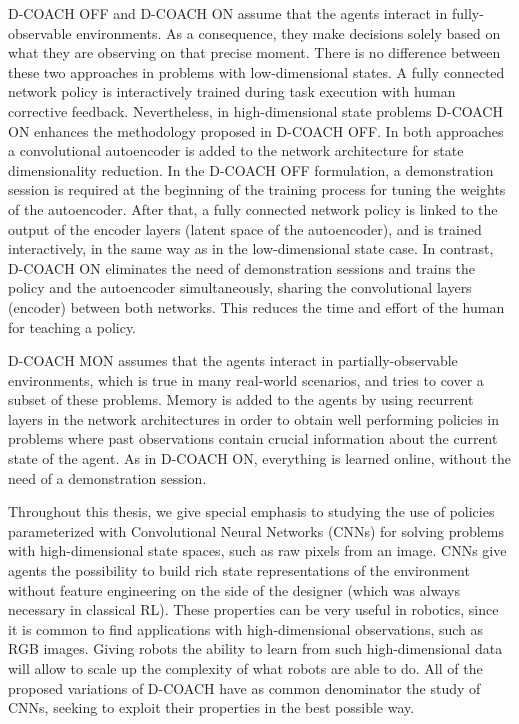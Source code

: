 D-COACH OFF and D-COACH ON assume that the agents interact in fully-observable environments. As a consequence, they make decisions solely based on what they are observing on that precise moment. There is no difference between these two approaches in problems with low-dimensional states. A fully connected network policy is interactively trained during task execution with human corrective feedback. Nevertheless, in high-dimensional state problems D-COACH ON enhances the methodology proposed in D-COACH OFF. In both approaches a convolutional autoencoder is added to the network architecture for state dimensionality reduction. In the D-COACH OFF formulation, a demonstration session is required at the beginning of the training process for tuning the weights of the autoencoder. After that, a fully connected network policy is linked to the output of the encoder layers (latent space of the autoencoder), and is trained interactively, in the same way as in the low-dimensional state case. In contrast, D-COACH ON eliminates the need of demonstration sessions and trains the policy and the autoencoder simultaneously, sharing the convolutional layers (encoder) between both networks. This reduces the time and effort of the human for teaching a policy.

D-COACH MON assumes that the agents interact in partially-observable environments, which is true in many real-world scenarios, and tries to cover a subset of these problems. Memory is added to the agents by using recurrent layers in the network architectures in order to obtain well performing policies in problems where past observations contain crucial information about the current state of the agent. As in D-COACH ON, everything is learned online, without the need of a demonstration session. 

Throughout this thesis, we give special emphasis to studying the use of policies parameterized with Convolutional Neural Networks (CNNs) for solving problems with high-dimensional state spaces, such as raw pixels from an image. CNNs give agents the possibility to build rich state representations of the environment without feature engineering on the side of the designer (which was always necessary in classical RL). These properties can be very useful in robotics, since it is common to find applications with high-dimensional observations, such as RGB images. Giving robots the ability to learn from such high-dimensional data will allow to scale up the complexity of what robots are able to do. All of the proposed variations of D-COACH have as common denominator the study of CNNs, seeking to exploit their properties in the best possible way. 

